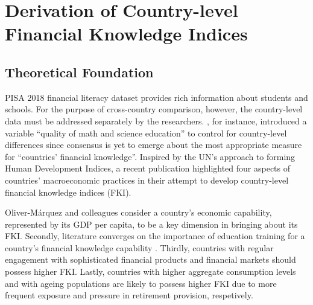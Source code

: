 \chapter{Derivation of Country-level Financial Knowledge Indices}


\section{Theoretical Foundation}

PISA 2018 financial literacy dataset \parencite{FLdata} provides rich information about students and schools. For the purpose of cross-country comparison, however, the country-level data must be addressed separately by the researchers. \textcite{morenoherrero:2018a}, for instance, introduced a variable ``quality of math and science education'' to control for country-level differences since consensus is yet to emerge about the most appropriate measure for ``countries' financial knowledge''. Inspired by the UN's approach to forming Human Development Indices, a recent publication \textcite{olivermarquez:2020} highlighted four aspects of countries' macroeconomic practices in their attempt to develop country-level financial knowledge indices (FKI).

Oliver-M{\'a}rquez and colleagues consider a country's economic capability, represented by its GDP per capita, to be a key dimension in bringing about its FKI. Secondly, literature converges on the importance of education training for a country's financial knowledge capability \parencite{oecd:2005}. Thirdly, countries with regular engagement with sophisticated financial products and financial markets should possess higher FKI. Lastly, countries with higher aggregate consumption levels and with ageing populations are likely to possess higher FKI due to more frequent exposure and pressure in retirement provision, respetively.

